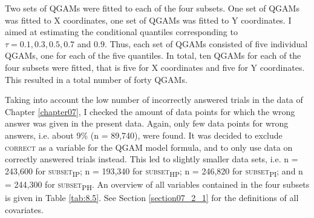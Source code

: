 Two sets of QGAMs were fitted to each of the four subsets. One set of QGAMs was fitted to X coordinates, one set of QGAMs was fitted to Y coordinates. I aimed at estimating the conditional quantiles corresponding to $\tau=0.1,0.3,0.5,0.7$ and $0.9$. Thus, each set of QGAMs consisted of five individual QGAMs, one for each of the five quantiles. In total, ten QGAMs for each of the four subsets were fitted, that is five for X coordinates and five for Y coordinates. This resulted in a total number of forty QGAMs.

Taking into account the low number of incorrectly answered trials in the data of Chapter \ref{chapter07}, I checked the amount of data points for which the wrong answer was given in the present data. Again, only few data points for wrong answers, i.e. about 9\% (n = 89,740), were found. It was decided to exclude \textsc{correct} as a variable for the QGAM model formula, and to only use data on correctly answered trials instead. This led to slightly smaller data sets, i.e. n = 243,600 for \textsc{subset\textsubscript{IP}}; n = 193,340 for \textsc{subset\textsubscript{HP}}; n = 246,820 for \textsc{subset\textsubscript{PI}}; and n = 244,300 for \textsc{subset\textsubscript{PH}}. An overview of all variables contained in the four subsets is given in Table \ref{tab:8.5}. See Section \ref{section07_2_1} for the definitions of all covariates.

